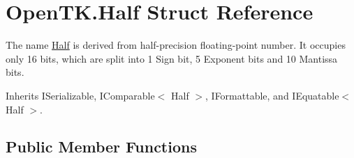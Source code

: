 \hypertarget{struct_open_t_k_1_1_half}{\section{Open\-T\-K.\-Half Struct Reference}
\label{struct_open_t_k_1_1_half}
}


The name \hyperlink{struct_open_t_k_1_1_half}{Half} is derived from half-\/precision floating-\/point number. It occupies only 16 bits, which are split into 1 Sign bit, 5 Exponent bits and 10 Mantissa bits.  




Inherits I\-Serializable, I\-Comparable$<$ Half $>$, I\-Formattable, and I\-Equatable$<$ Half $>$.

\subsection*{Public Member Functions}

